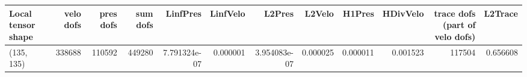 \begin{tabular}{lrrrrrrrrrrr}
\toprule
Local tensor shape &  velo dofs &  pres dofs &  sum dofs &     LinfPres &  LinfVelo &       L2Pres &   L2Velo &   H1Pres &  HDivVelo &  trace dofs (part of velo dofs) &  L2Trace \\
\midrule
        (135, 135) &     338688 &     110592 &    449280 & 7.791324e-07 &  0.000001 & 3.954083e-07 & 0.000025 & 0.000011 &  0.001523 &                          117504 & 0.656608 \\
\bottomrule
\end{tabular}
